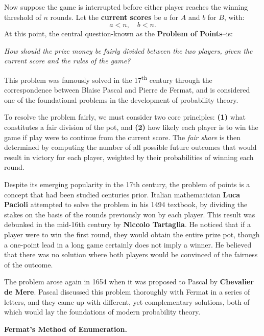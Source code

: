 Now suppose the game is interrupted before either player reaches the winning threshold of \(n\) rounds. Let the \textbf{current scores} be \(a\) for \(A\) and \(b\) for \(B\), with:
\[
a < n, \quad b < n.
\]
At this point, the central question-known as the \textbf{Problem of Points}--is:

\begin{center}
    \textit{How should the prize money be fairly divided between the two players, given the current score and the rules of the game?}
\end{center}

This problem was famously solved in the 17\textsuperscript{th} century through the correspondence between Blaise Pascal and Pierre de Fermat, and is considered one of the foundational problems in the development of probability theory.

To resolve the problem fairly, we must consider two core principles: \textbf{(1)} what constitutes a fair division of the pot, and \textbf{(2)} how likely each player is to win the game if play were to continue from the current score. The \textit{fair share} is then determined by computing the number of all possible future outcomes that would result in victory for each player, weighted by their probabilities of winning each round.

\vspace{0.5em}

Despite its emerging popularity in the 17th century, the problem of points is a concept that had been studied centuries prior. Italian mathematician \textbf{Luca Pacioli} attempted to solve the problem in his 1494 textbook, by dividing the stakes on the basis of the rounds previously won by each player. This result was debunked in the mid-16th century by \textbf{Niccolo Tartaglia}. He noticed that if a player were to win the first round, they would obtain the entire prize pot, though a one-point lead in a long game certainly does not imply a winner.
He believed that there was no solution where both players would be convinced of the fairness of the outcome.

The problem arose again in 1654 when it was proposed to Pascal by \textbf{Chevalier de Mere}. Pascal discussed this problem thoroughly with Fermat in a series of letters, and they came up with different, yet complementary solutions, both of which would lay the foundations of modern probability theory. 

\vspace{1em}
\noindent\textbf{Fermat’s Method of Enumeration.}
\vspace{1em}

